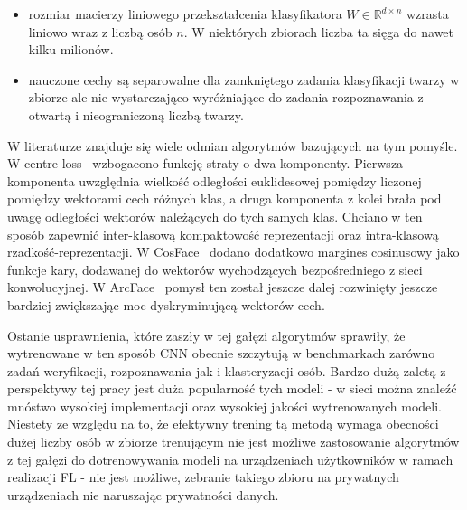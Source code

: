 \begin{itemize}
  \item rozmiar macierzy liniowego przekształcenia klasyfikatora \(W \in \mathbb{R}^{d \times n}\) wzrasta liniowo wraz z liczbą osób \(n\). W niektórych zbiorach liczba ta sięga do nawet kilku milionów. 
  \item nauczone cechy są separowalne dla zamkniętego zadania klasyfikacji twarzy w zbiorze ale nie wystarczająco wyróżniające do zadania rozpoznawania z otwartą i nieograniczoną liczbą twarzy.
\end{itemize}

W literaturze znajduje się wiele odmian algorytmów bazujących na tym pomyśle. W centre
loss~\cite{Centreloss} wzbogacono funkcję straty o dwa komponenty. Pierwsza komponenta uwzględnia
wielkość odległości euklidesowej pomiędzy liczonej pomiędzy wektorami cech różnych klas, a druga
komponenta z kolei brała pod uwagę odległości wektorów należących do tych samych klas. Chciano w
ten sposób zapewnić inter-klasową kompaktowość reprezentacji oraz intra-klasową
rzadkość-reprezentacji. W CosFace~\cite{Cosface} dodano dodatkowo margines cosinusowy jako funkcje
kary, dodawanej do wektorów wychodzących bezpośredniego z sieci konwolucyjnej. W
ArcFace~\cite{Arcface} pomysł ten został jeszcze dalej rozwinięty jeszcze bardziej zwiększając moc
dyskryminującą wektorów cech. 

Ostanie usprawnienia, które zaszły w tej gałęzi algorytmów sprawiły, że wytrenowane w ten sposób CNN obecnie szczytują  w benchmarkach zarówno zadań weryfikacji, rozpoznawania jak i klasteryzacji osób. Bardzo dużą zaletą z perspektywy tej pracy jest duża popularność tych modeli - w sieci można znaleźć mnóstwo wysokiej implementacji oraz wysokiej jakości wytrenowanych modeli.  Niestety ze względu na to, że efektywny trening tą metodą wymaga obecności dużej liczby osób w zbiorze trenującym nie jest możliwe zastosowanie algorytmów z tej gałęzi do dotrenowywania modeli na urządzeniach użytkowników w ramach realizacji FL - nie jest możliwe, zebranie takiego zbioru na prywatnych urządzeniach nie naruszając prywatności danych.


